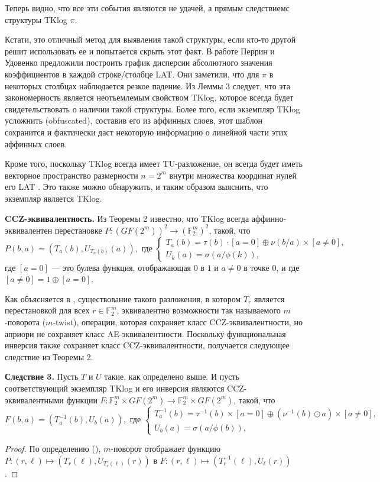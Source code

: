 Теперь видно, что все эти события являются не удачей, а прямым следствиемс структуры TKlog \(\pi\).

Кстати, это отличный метод для выявления такой структуры, если кто-то другой решит использовать ее и попытается скрыть этот факт. В работе \cite{PU16} Перрин и Удовенко предложили построить график дисперсии абсолютного значения коэффициентов в каждой строке/столбце LAT. Они заметили, что для \(\pi\) в некоторых столбцах наблюдается резкое падение. Из Леммы 3 следует, что эта закономерность является неотъемлемым свойством TKlog, которое всегда будет свидетельствовать о наличии такой структуры. Более того, если экземпляр TKlog усложнить (obfuscated), составив его из аффинных слоев, этот шаблон сохранится и фактически даст некоторую информацию о линейной части этих аффинных слоев.

Кроме того, поскольку TKlog всегда имеет TU-разложение, он всегда будет иметь векторное пространство размерности \(n = 2^m\)  внутри множества координат нулей его LAT \cite{CP19}. Это также можно обнаружить, и таким образом выяснить, что экземпляр является TKlog.

\textbf{CCZ-эквивалентность.} Из Теоремы 2 известно, что TKlog всегда аффинно-эквивалентен перестановке \(P : (GF(2^m))^2 \to (\mathbb{F}_2^m)^2\), такой, что
\[
P(b, a) = \left(T_a(b), U_{T_a(b)}(a)\right), \text{ где }\left\{\begin{array}{l}
T_a(b) = \tau(b) \cdot [a = 0] \oplus \nu(b/a) \times [a \neq 0], \\
U_k(a) = \sigma(a/\phi(k)),
\end{array}\right.
\]
где \([a = 0]\) — это булева функция, отображающая \(0\) в \(1\) и \(a \neq 0\) в точке \(0\), и где \([a \neq 0] = 1 \oplus [a = 0]\).

Как объясняется в \cite{CP19}, существование такого разложения, в котором \(T_r\) является перестановкой для всех \(r \in \mathbb{F}_2^m\), эквивалентно возможности так называемого \(m\)-поворота (\(m\)-twist), операции, которая сохраняет класс CCZ-эквивалентности, но априори не сохраняет класс AE-эквивалентности. Поскольку функциональная инверсия также сохраняет класс CCZ-эквивалентности, получается следующее следствие из Теоремы 2.

\textbf{Следствие 3.}
Пусть \(T\) и \(U\) такие, как определено выше. И пусть соответствующий экземпляр TKlog и его инверсия являются CCZ-эквивалентными функции \(F : \mathbb{F}_2^m \times GF(2^m) \to \mathbb{F}_2^m \times GF(2^m)\), такой, что
\[
F(b, a) = \left(T_a^{-1}(b), U_b(a)\right), \text{ где }\left
\{\begin{array}{l}
T_a^{-1}(b) = \tau^{-1}(b) \times [a = 0] \oplus \left(\nu^{-1}(b) \odot a\right) \times [a \neq 0], \\
U_b(a) = \sigma(a/\phi(b)),
\end{array}\right.
\]
\begin{proof}
По определению (\cite{CP19}), \(m\)-поворот отображает функцию \(P : (r, \ell) \mapsto \left(T_r(\ell), U_{T_r(\ell)}(r)\right)\) в \(F : (r, \ell) \mapsto \left(T_r^{-1}(\ell), U_{\ell}(r)\right)\).
\end{proof}

